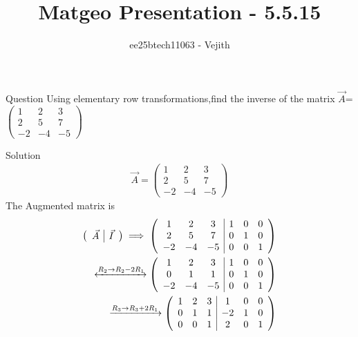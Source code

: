 \documentclass{beamer}
\title{Matgeo Presentation - 5.5.15}
\author{ee25btech11063 - Vejith}
\numberwithin{equation}{section}
\theoremstyle{remark}
\begin{document}
\frame{\titlepage}
\begin{frame}{Question}
Using elementary row transformations,find the inverse of the matrix $\Vec{A}$=
$\begin{pmatrix}
        1 & 2 & 3 \\
        2 & 5 & 7 \\
        -2 & -4 & -5
    \end{pmatrix}$
\end{frame}

\begin{frame}{Solution}
    \begin{align}
    \Vec{A}=
\begin{pmatrix}
        1 & 2 & 3 \\
        2 & 5 & 7 \\
        -2 & -4 & -5
    \end{pmatrix}
\end{align}
The Augmented matrix is
    \begin{align}
\left(\begin{array}{c|c}
        \Vec{A} & \Vec{I}
\end{array}\right)
\implies 
\left(\begin{array}{ccc|ccc}
        1 & 2 & 3 & 1 & 0 & 0\\
        2 & 5 & 7 &  0 & 1 & 0\\
        -2 & -4 & -5 & 0 & 0 &1
\end{array}\right) \\
\xleftrightarrow{R_2 \rightarrow R_2-2R_1}  \left(\begin{array}{ccc|ccc}
        1 & 2 & 3 & 1 & 0 & 0\\
        0 & 1 & 1 &  0 & 1 & 0\\
        -2 & -4 & -5 & 0 & 0 &1
\end{array}\right)\\
\xrightarrow{R_3 \rightarrow R_3+2R_1} \left(\begin{array}{ccc|ccc}
        1 & 2 & 3 & 1 & 0 & 0\\
        0 & 1 & 1 &  -2 & 1 & 0\\
        0 & 0 & 1 & 2 & 0 &1
\end{array}\right)
\end{align}
\end{frame}
\end{document}
